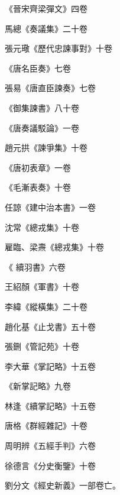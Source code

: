 \begin{pinyinscope}
 《晉宋齊梁彈文》四卷



 馬總《奏議集》二十卷



 張元璥《歷代忠諫事對》十卷



 《唐名臣奏》七卷



 張易《唐直臣諫奏》七卷



 《御集諫書》八十卷



 《唐奏議駁論》一卷



 趙元拱《諫爭集》十卷



 《唐初表章》一卷



 《毛漸表奏》十卷



 任諒《建中治本書》一卷



 沈常《總戎集》十卷



 雇臨、梁燾《總戎集》十卷



 《
 續羽書》六卷



 王紹顏《軍書》十卷



 李緯《縱橫集》二十卷



 趙化基《止戈書》五十卷



 張鉶《管記苑》十卷



 李大華《掌記略》十五卷



 《新掌記略》九卷



 林逢《續掌記略》十五卷



 唐格《群經雜記》十卷



 周明辨《五經手判》六卷



 徐德言《分史衡鑒》十卷



 劉分文《經史新義》一部卷亡。




\end{pinyinscope}
